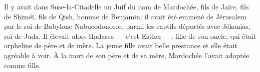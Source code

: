 Il y avait dans Suse-la-Citadelle un Juif du nom de Mardochée,
	fils de Jaïre, fils de Shiméï, fils de Qish, homme de Benjamin;
	il avait été emmené de Jérusalem par le roi de Babylone Nabucodonosor,
	parmi les captifs déportés avec Jékonias, roi de Juda.
Il élevait alors Hadassa --- c’est Esther ---,
	fille de son oncle, qui était orpheline de père et de mère.
La jeune fille avait belle prestance et elle était agréable à voir.
À la mort de son père et de sa mère, Mardochée l’avait adoptée comme fille.
